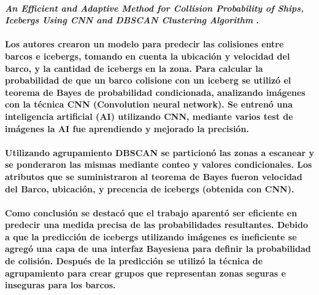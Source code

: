 \paragraph{
    \textbf{\emph{An Efficient and Adaptive Method for Collision
            Probability of Ships, Icebergs Using CNN
            and DBSCAN Clustering Algorithm}
    }
    \cite[pág. 20]{somani_emerging_2019}.
}

\paragraph{
    Los autores crearon un modelo para predecir las colisiones entre barcos e icebergs,
    tomando en cuenta la ubicación y velocidad del barco, y la cantidad de icebergs en la zona.
    Para calcular la probabilidad de que un barco colisione con un iceberg
    se utilizó el teorema de Bayes de probabilidad condicionada, analizando imágenes con la técnica CNN (Convolution neural network).
    Se entrenó una inteligencia artificial (AI) utilizando CNN, mediante varios test de imágenes la AI fue aprendiendo
    y mejorado la precisión.
}

\paragraph{
    Utilizando agrupamiento DBSCAN se particionó las zonas a escanear y se ponderaron
    las mismas mediante conteo y valores condicionales. Los atributos que se suministraron al teorema de Bayes fueron
    velocidad del Barco, ubicación, y precencia de icebergs (obtenida con CNN).
}

\paragraph{
    Como conclusión se destacó que el trabajo aparentó ser eficiente en predecir
    una medida precisa de  las probabilidades resultantes.
    Debido a que la predicción de icebergs utilizando imágenes es ineficiente se agregó una capa de una interfaz Bayesiena
    para definir la probabilidad de colisión. Después de la predicción se utilizó
    la técnica de agrupamiento para crear grupos que representan zonas seguras e inseguras para los barcos.
}